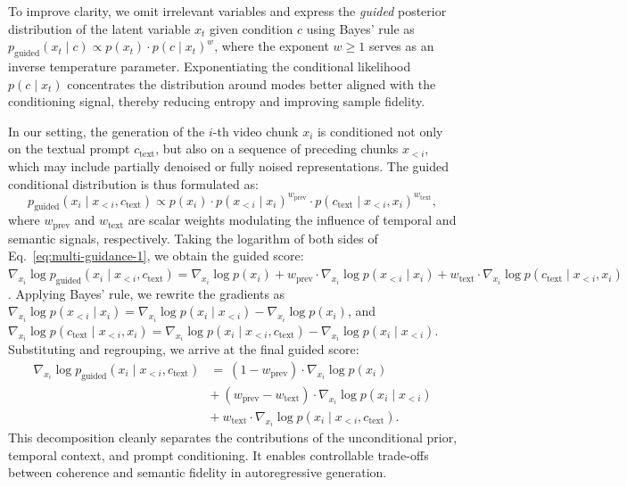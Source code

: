 To improve clarity, we omit irrelevant variables and express the \textit{guided} posterior distribution of the latent variable \( x_t \) given condition \( c \) using Bayes’ rule as \( p_\text{guided}(x_t \mid c) \propto p(x_t) \cdot p(c \mid x_t)^w \), where the exponent \( w \geq 1 \) serves as an inverse temperature parameter. Exponentiating the conditional likelihood \( p(c \mid x_t) \) concentrates the distribution around modes better aligned with the conditioning signal, thereby reducing entropy and improving sample fidelity.


In our setting, the generation of the \(i\)-th video chunk \(x_i\) is conditioned not only on the textual prompt \(c_{\text{text}}\), but also on a sequence of preceding chunks \(x_{<i}\), which may include partially denoised or fully noised representations. The guided conditional distribution is thus formulated as:
\begin{equation}
p_{\text{guided}}(x_i \mid x_{<i}, c_{\text{text}}) \propto p(x_i) \cdot p(x_{<i} \mid x_i)^{w_{\text{prev}}} \cdot p(c_{\text{text}} \mid x_{<i}, x_i)^{w_{\text{text}}},
\label{eq:multi-guidance-1}
\end{equation}
where \(w_{\text{prev}}\) and \(w_{\text{text}}\) are scalar weights modulating the influence of temporal and semantic signals, respectively.
Taking the logarithm of both sides of Eq.~\ref{eq:multi-guidance-1}, we obtain the guided score:  
\(\nabla_{x_i} \log p_{\text{guided}}(x_i \mid x_{<i}, c_{\text{text}}) = \nabla_{x_i} \log p(x_i) + w_{\text{prev}} \cdot \nabla_{x_i} \log p(x_{<i} \mid x_i) + w_{\text{text}} \cdot \nabla_{x_i} \log p(c_{\text{text}} \mid x_{<i}, x_i)\).
Applying Bayes' rule, we rewrite the gradients as  
\(\nabla_{x_i} \log p(x_{<i} \mid x_i) = \nabla_{x_i} \log p(x_i \mid x_{<i}) - \nabla_{x_i} \log p(x_i) \),  
and  
\(\nabla_{x_i} \log p(c_{\text{text}} \mid x_{<i}, x_i) = \nabla_{x_i} \log p(x_i \mid x_{<i}, c_{\text{text}}) - \nabla_{x_i} \log p(x_i \mid x_{<i}) \).
Substituting and regrouping, we arrive at the final guided score:
\begin{equation}
\begin{aligned}
\nabla_{x_i} \log p_{\text{guided}}(x_i \mid x_{<i}, c_{\text{text}}) 
&= \ (1 - w_{\text{prev}}) \cdot \nabla_{x_i} \log p(x_i) \\
&+\ (w_{\text{prev}} - w_{\text{text}}) \cdot \nabla_{x_i} \log p(x_i \mid x_{<i}) \\
&+\ w_{\text{text}} \cdot \nabla_{x_i} \log p(x_i \mid x_{<i}, c_{\text{text}}).
\end{aligned}
\label{eq:final-score}
\end{equation}
This decomposition cleanly separates the contributions of the unconditional prior, temporal context, and prompt conditioning. It enables controllable trade-offs between coherence and semantic fidelity in autoregressive generation.

